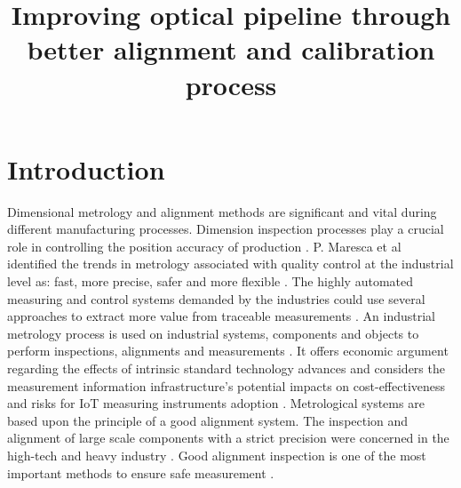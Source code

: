 \documentclass[10pt,a4paper,onecolumn]{article}
\begin{document}
	
	\title{Improving optical pipeline through better alignment and calibration process}
	
	\maketitle
	
	\section{Introduction}
	\label{intro}
	Dimensional metrology and alignment methods are significant and vital during different manufacturing processes. Dimension inspection processes play a crucial role in controlling the position accuracy of production \cite{gu2020study}. P. Maresca et al identified the trends in metrology associated with quality control at the industrial level as: fast, more precise, safer and more flexible \cite{maresca2019evaluation}. The highly automated measuring and control systems demanded by the industries could use several approaches to extract more value from traceable measurements \cite{hall2019opportunity}. An industrial metrology process is used on industrial systems, components and objects to perform inspections, alignments and measurements \cite{moru2020machine}. It offers economic argument regarding the effects of intrinsic standard technology advances and considers the measurement information infrastructure's potential impacts on cost-effectiveness and risks for IoT measuring instruments adoption \cite{kuster2020measurement}. Metrological systems are based upon the principle of a good alignment system. The inspection and alignment of large scale components with a strict precision were concerned in the high-tech and heavy industry \cite{gu2020study}. Good alignment inspection is one of the most important methods to ensure safe measurement \cite{peng2020inertial}.
	
	\newpage
	
	
	  
\end{document}
